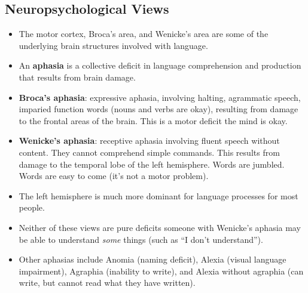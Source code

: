 \documentclass[]{article}
\begin{document}
		\subsection{Neuropsychological Views}
			\begin{itemize}
				\item The motor cortex, Broca's area, and Wenicke's area are some of the underlying brain structures involved with language.
				\item An \textbf{aphasia} is a collective deficit in language comprehension and production that results from brain damage.
				\item \textbf{Broca's aphasia}: expressive aphasia, involving halting, agrammatic speech, imparied function words (nouns and verbs are okay), resulting from damage to the frontal areas of the brain. This is a motor deficit \textendash{} the mind is okay.
				\item \textbf{Wenicke's aphasia}: receptive aphasia involving fluent speech without content. They cannot comprehend simple commands. This results from damage to the temporal lobe of the left hemisphere. Words are jumbled. Words are easy to come (it's not a motor problem).
				\item The left hemisphere is much more dominant for language processes for most people.
				\item Neither of these views are pure deficits \textendash{} someone with Wenicke's aphasia may be able to understand \emph{some} things (such as ``I don't understand'').
				\item Other aphasias include Anomia (naming deficit), Alexia (visual language impairment), Agraphia (inability to write), and Alexia without agraphia (can write, but cannot read what they have written).
			\end{itemize}
\end{document}
